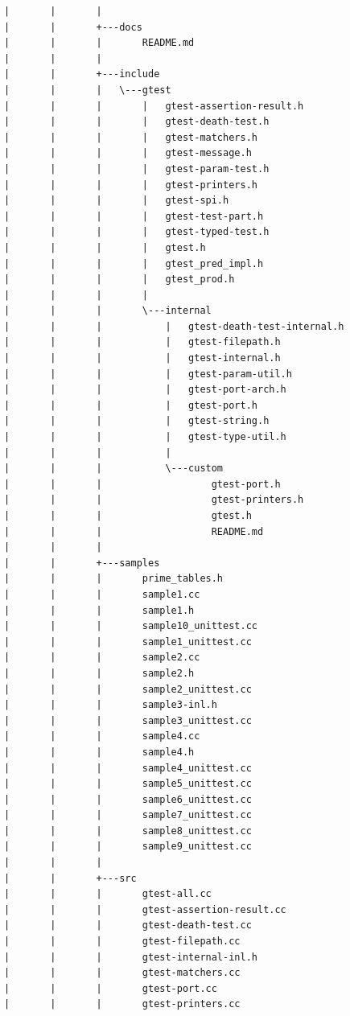 \documentclass[12pt,a4paper]{article}
\begin{document}
\begin{verbatim}
|       |       |       
|       |       +---docs
|       |       |       README.md
|       |       |       
|       |       +---include
|       |       |   \---gtest
|       |       |       |   gtest-assertion-result.h
|       |       |       |   gtest-death-test.h
|       |       |       |   gtest-matchers.h
|       |       |       |   gtest-message.h
|       |       |       |   gtest-param-test.h
|       |       |       |   gtest-printers.h
|       |       |       |   gtest-spi.h
|       |       |       |   gtest-test-part.h
|       |       |       |   gtest-typed-test.h
|       |       |       |   gtest.h
|       |       |       |   gtest_pred_impl.h
|       |       |       |   gtest_prod.h
|       |       |       |   
|       |       |       \---internal
|       |       |           |   gtest-death-test-internal.h
|       |       |           |   gtest-filepath.h
|       |       |           |   gtest-internal.h
|       |       |           |   gtest-param-util.h
|       |       |           |   gtest-port-arch.h
|       |       |           |   gtest-port.h
|       |       |           |   gtest-string.h
|       |       |           |   gtest-type-util.h
|       |       |           |   
|       |       |           \---custom
|       |       |                   gtest-port.h
|       |       |                   gtest-printers.h
|       |       |                   gtest.h
|       |       |                   README.md
|       |       |                   
|       |       +---samples
|       |       |       prime_tables.h
|       |       |       sample1.cc
|       |       |       sample1.h
|       |       |       sample10_unittest.cc
|       |       |       sample1_unittest.cc
|       |       |       sample2.cc
|       |       |       sample2.h
|       |       |       sample2_unittest.cc
|       |       |       sample3-inl.h
|       |       |       sample3_unittest.cc
|       |       |       sample4.cc
|       |       |       sample4.h
|       |       |       sample4_unittest.cc
|       |       |       sample5_unittest.cc
|       |       |       sample6_unittest.cc
|       |       |       sample7_unittest.cc
|       |       |       sample8_unittest.cc
|       |       |       sample9_unittest.cc
|       |       |       
|       |       +---src
|       |       |       gtest-all.cc
|       |       |       gtest-assertion-result.cc
|       |       |       gtest-death-test.cc
|       |       |       gtest-filepath.cc
|       |       |       gtest-internal-inl.h
|       |       |       gtest-matchers.cc
|       |       |       gtest-port.cc
|       |       |       gtest-printers.cc

\end{verbatim}
\end{document}
